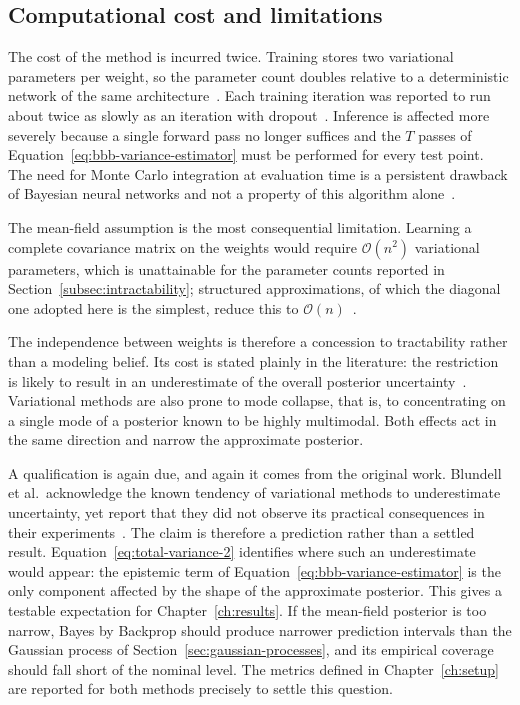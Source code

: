 \subsection{Computational cost and limitations}
\label{subsec:bbb-limitations}
 
The cost of the method is incurred twice. Training stores two variational parameters
per weight, so the parameter count doubles relative to a deterministic network of the
same architecture~\cite{arbel2023}. Each training iteration was reported to run about
twice as slowly as an iteration with dropout~\cite{blundell2015}. Inference is
affected more severely because a single forward pass no longer suffices and the
$T$ passes of Equation~\eqref{eq:bbb-variance-estimator} must be performed for every
test point. The need for Monte Carlo integration at evaluation time is a persistent
drawback of Bayesian neural networks and not a property of this algorithm
alone~\cite{jospin2022}.

The mean-field assumption is the most consequential limitation. Learning a complete
covariance matrix on the weights would require $\mathcal{O}(n^2)$ variational
parameters, which is unattainable for the parameter counts reported in
Section~\ref{subsec:intractability}; structured approximations, of which the
diagonal one adopted here is the simplest, reduce this to
$\mathcal{O}(n)$~\cite{jospin2022}.

The independence between weights is therefore a
concession to tractability rather than a modeling belief. Its cost is stated
plainly in the literature: the restriction is likely to result in an underestimate
of the overall posterior uncertainty~\cite{arbel2023}. Variational methods are also
prone to mode collapse, that is, to concentrating on a single mode of a posterior
known to be highly multimodal. Both effects act in the same direction and narrow the
approximate posterior.

A qualification is again due, and again it comes from the original work. Blundell et
al.\ acknowledge the known tendency of variational methods to underestimate
uncertainty, yet report that they did not observe its practical consequences in
their experiments~\cite{blundell2015}. The claim is therefore a prediction rather
than a settled result. Equation~\eqref{eq:total-variance-2} identifies where such an
underestimate would appear: the epistemic term of Equation~\eqref{eq:bbb-variance-estimator} is the only component affected by the shape of the approximate posterior. This gives a testable expectation for Chapter~\ref{ch:results}. If the mean-field posterior is too narrow, Bayes by
Backprop should produce narrower prediction intervals than the Gaussian process of
Section~\ref{sec:gaussian-processes}, and its empirical coverage should fall short of
the nominal level. The metrics defined in Chapter~\ref{ch:setup} are reported for
both methods precisely to settle this question.

